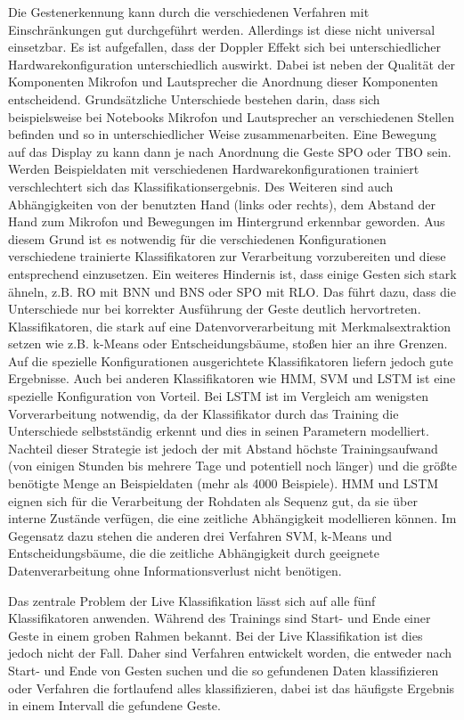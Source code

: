 Die Gestenerkennung kann durch die verschiedenen Verfahren mit Einschränkungen
gut durchgeführt werden. Allerdings ist diese nicht universal einsetzbar. Es ist
aufgefallen, dass der Doppler Effekt sich bei unterschiedlicher
Hardwarekonfiguration unterschiedlich auswirkt. Dabei ist neben der Qualität der
Komponenten Mikrofon und Lautsprecher die Anordnung dieser Komponenten
entscheidend. Grundsätzliche Unterschiede bestehen darin, dass sich
beispielsweise bei Notebooks Mikrofon und Lautsprecher an verschiedenen Stellen
befinden und so in unterschiedlicher Weise zusammenarbeiten. Eine Bewegung auf
das Display zu kann dann je nach Anordnung die Geste \acl{SPO} oder \acl{TBO}
sein. Werden Beispieldaten mit verschiedenen Hardwarekonfigurationen trainiert
verschlechtert sich das Klassifikationsergebnis. Des Weiteren sind auch
Abhängigkeiten von der benutzten Hand (links oder rechts), dem Abstand der Hand
zum Mikrofon und Bewegungen im Hintergrund erkennbar geworden. Aus diesem Grund
ist es notwendig für die verschiedenen Konfigurationen verschiedene trainierte
Klassifikatoren zur Verarbeitung vorzubereiten und diese entsprechend
einzusetzen. Ein weiteres Hindernis ist, dass einige Gesten sich stark ähneln,
z.B. \ac{RO} mit \ac{BNN} und \ac{BNS} oder \ac{SPO} mit \ac{RLO}. Das führt
dazu, dass die Unterschiede nur bei korrekter Ausführung der Geste deutlich
hervortreten.
Klassifikatoren, die stark auf eine Datenvorverarbeitung mit Merkmalsextraktion
setzen wie z.B. k-Means oder Entscheidungsbäume, stoßen hier an ihre Grenzen.
Auf die spezielle Konfigurationen ausgerichtete Klassifikatoren liefern jedoch
gute Ergebnisse. Auch bei anderen Klassifikatoren wie \ac{HMM}, \ac{SVM} und
\ac{LSTM} ist eine spezielle Konfiguration von Vorteil. Bei \ac{LSTM} ist im
Vergleich am wenigsten Vorverarbeitung notwendig, da der Klassifikator durch das
Training die Unterschiede selbstständig erkennt und dies in seinen Parametern
modelliert. Nachteil dieser Strategie ist jedoch der mit Abstand höchste
Trainingsaufwand (von einigen Stunden bis mehrere Tage und potentiell noch
länger) und die größte benötigte Menge an Beispieldaten (mehr als 4000
Beispiele). \ac{HMM} und \ac{LSTM} eignen sich für die Verarbeitung der Rohdaten
als Sequenz gut, da sie über interne Zustände verfügen, die eine zeitliche
Abhängigkeit modellieren können. Im Gegensatz dazu stehen die anderen drei
Verfahren \ac{SVM}, k-Means und Entscheidungsbäume, die die zeitliche
Abhängigkeit durch geeignete Datenverarbeitung ohne Informationsverlust nicht
benötigen.

Das zentrale Problem der Live Klassifikation lässt sich auf alle fünf
Klassifikatoren anwenden. Während des Trainings sind Start- und Ende einer Geste
in einem groben Rahmen bekannt. Bei der Live Klassifikation ist dies jedoch
nicht der Fall. Daher sind Verfahren entwickelt worden, die entweder nach Start-
und Ende von Gesten suchen und die so gefundenen Daten klassifizieren oder
Verfahren die fortlaufend alles klassifizieren,
dabei ist das häufigste Ergebnis in einem Intervall die gefundene Geste.

